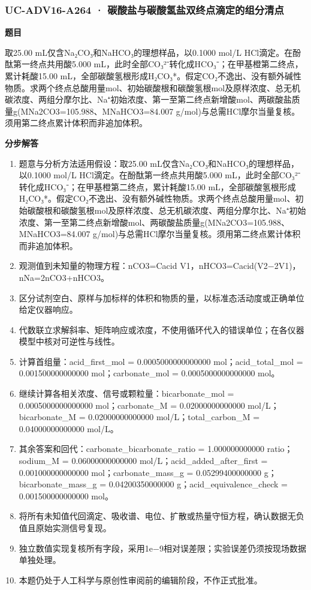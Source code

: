 \documentclass[UTF8,11pt,a4paper]{ctexart}
\begin{document}
\subsubsection*{UC-ADV16-A264 · 碳酸盐与碳酸氢盐双终点滴定的组分清点}
\noindent\textbf{题目}\par
取25.00 mL仅含Na₂CO₃和NaHCO₃的理想样品，以0.1000 mol/L HCl滴定。在酚酞第一终点共用酸5.000 mL，此时全部CO₃²⁻转化成HCO₃⁻；在甲基橙第二终点，累计耗酸15.00 mL，全部碳酸氢根形成H₂CO₃*。假定CO₂不逸出、没有额外碱性物质。求两个终点总酸用量mol、初始碳酸根和碳酸氢根mol及原样浓度、总无机碳浓度、两组分摩尔比、Na⁺初始浓度、第一至第二终点新增酸mol、两碳酸盐质量g(MNa2CO3=105.988、MNaHCO3=84.007 g/mol)与总需HCl摩尔当量复核。须用第二终点累计体积而非追加体积。\par
\medskip\noindent\textbf{分步解答}
\begin{enumerate}
\item 题意与分析方法适用假设：取25.00 mL仅含Na₂CO₃和NaHCO₃的理想样品，以0.1000 mol/L HCl滴定。在酚酞第一终点共用酸5.000 mL，此时全部CO₃²⁻转化成HCO₃⁻；在甲基橙第二终点，累计耗酸15.00 mL，全部碳酸氢根形成H₂CO₃*。假定CO₂不逸出、没有额外碱性物质。求两个终点总酸用量mol、初始碳酸根和碳酸氢根mol及原样浓度、总无机碳浓度、两组分摩尔比、Na⁺初始浓度、第一至第二终点新增酸mol、两碳酸盐质量g(MNa2CO3=105.988、MNaHCO3=84.007 g/mol)与总需HCl摩尔当量复核。须用第二终点累计体积而非追加体积。
\item 观测值到未知量的物理方程：nCO3=Cacid V1，nHCO3=Cacid(V2−2V1)，nNa=2nCO3+nHCO3。
\item 区分试剂空白、原样与加标样的体积和物质的量，以标准态活动度或正确单位给定仪器响应。
\item 代数联立求解斜率、矩阵响应或浓度，不使用循环代入的错误单位；在各仪器模型中核对可逆性与线性。
\item 计算首组量：acid\_first\_mol = 0.0005000000000000 mol；acid\_total\_mol = 0.001500000000000 mol；carbonate\_mol = 0.0005000000000000 mol。
\item 继续计算各相关浓度、信号或颗粒量：bicarbonate\_mol = 0.0005000000000000 mol；carbonate\_M = 0.02000000000000 mol/L；bicarbonate\_M = 0.02000000000000 mol/L；total\_carbon\_M = 0.04000000000000 mol/L。
\item 其余答案和回代：carbonate\_bicarbonate\_ratio = 1.000000000000 ratio；sodium\_M = 0.06000000000000 mol/L；acid\_added\_after\_first = 0.001000000000000 mol；carbonate\_mass\_g = 0.05299400000000 g；bicarbonate\_mass\_g = 0.04200350000000 g；acid\_equivalence\_check = 0.001500000000000 mol。
\item 将所有未知值代回滴定、吸收谱、电位、扩散或热量守恒方程，确认数据无负值且原始实测信号复现。
\item 独立数值实现复核所有字段，采用1e−9相对误差限；实验误差仍须按现场数据单独处理。
\item 本题仍处于人工科学与原创性审阅前的编辑阶段，不作正式批准。
\end{enumerate}
\end{document}
